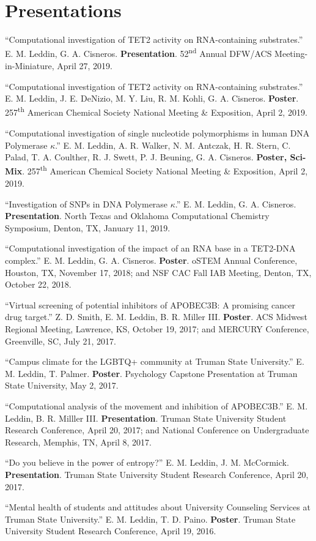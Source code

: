 \documentclass[letterpaper,11pt]{article}
\begin{document}
\section{Presentations}
\begin{etaremune}
\small{
  \item \textnormal{``Computational investigation of TET2 activity on RNA-containing substrates.'' E. M. Leddin, G. A. Cisneros. \textbf{Presentation}. 52\textsuperscript{nd} Annual DFW/ACS Meeting-in-Miniature, April 27, 2019.}
  \item \textnormal{``Computational investigation of TET2 activity on RNA-containing substrates.'' E. M. Leddin, J. E. DeNizio, M. Y. Liu, R. M. Kohli, G. A. Cisneros. \textbf{Poster}. 257\textsuperscript{th} American Chemical Society National Meeting \& Exposition, April 2, 2019.}
  \item \textnormal{``Computational investigation of single nucleotide polymorphisms in human DNA Polymerase $\kappa$.'' E. M. Leddin, A. R. Walker, N. M. Antczak, H. R. Stern, C. Palad, T. A. Coulther, R. J. Swett, P. J. Beuning, G. A. Cisneros. \textbf{Poster, Sci-Mix}. 257\textsuperscript{th} American Chemical Society National Meeting \& Exposition, April 2, 2019.}
  \item \textnormal{``Investigation of SNPs in DNA Polymerase $\kappa$.'' E. M. Leddin, G. A. Cisneros. \textbf{Presentation}. North Texas and Oklahoma Computational Chemistry Symposium, Denton, TX, January 11, 2019.}
  \item \textnormal{``Computational investigation of the impact of an RNA base in a TET2-DNA complex.'' E. M. Leddin, G. A. Cisneros. \textbf{Poster}. oSTEM Annual Conference, Houston, TX, November 17, 2018; and NSF CAC Fall IAB Meeting, Denton, TX, October 22, 2018.}
  \item \textnormal{``Virtual screening of potential inhibitors of APOBEC3B: A promising cancer drug target.'' Z. D. Smith, E. M. Leddin, B. R. Miller III. \textbf{Poster}. ACS Midwest Regional Meeting, Lawrence, KS, October 19, 2017; and MERCURY Conference, Greenville, SC, July 21, 2017.}
  \item \textnormal{``Campus climate for the LGBTQ+ community at Truman State University.'' E. M. Leddin, T. Palmer. \textbf{Poster}. Psychology Capstone Presentation at Truman State University, May 2, 2017.}
  \item \textnormal{``Computational analysis of the movement and inhibition of APOBEC3B.'' E. M. Leddin, B. R. Milller III. \textbf{Presentation}. Truman State University Student Research Conference, April 20, 2017; and National Conference on Undergraduate Research, Memphis, TN, April 8, 2017.}
  \item \textnormal{``Do you believe in the power of entropy?'' E. M. Leddin, J. M. McCormick. \textbf{Presentation}. Truman State University Student Research Conference, April 20, 2017.}
  \item \textnormal{``Mental health of students and attitudes about University Counseling Services at Truman State University.'' E. M. Leddin, T. D. Paino. \textbf{Poster}. Truman State University Student Research Conference, April 19, 2016.}
  }
\end{etaremune}
\end{document}
